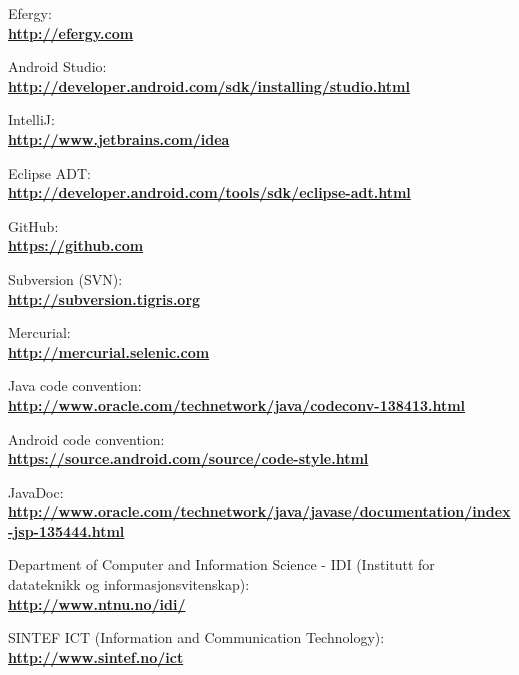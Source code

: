 \begin{thebibliography}{1}
 Efergy:\\
\textbf{ \url{http://efergy.com}}

 Android Studio:\\
\textbf{ \url{http://developer.android.com/sdk/installing/studio.html}}

 IntelliJ:\\
\textbf{ \url{http://www.jetbrains.com/idea}}

 Eclipse ADT:\\
\textbf{ \url{http://developer.android.com/tools/sdk/eclipse-adt.html}}

 GitHub:\\
\textbf{ \url{https://github.com}}

 Subversion (SVN):\\
\textbf{ \url{http://subversion.tigris.org}}

 Mercurial:\\
\textbf{ \url{http://mercurial.selenic.com}}

 Java code convention:\\
\textbf{ \url{http://www.oracle.com/technetwork/java/codeconv-138413.html}}

 Android code convention:\\
\textbf{ \url{https://source.android.com/source/code-style.html}}

 JavaDoc:\\
\textbf{ \url{http://www.oracle.com/technetwork/java/javase/documentation/index-jsp-135444.html}}

 Department of Computer and Information Science - IDI (Institutt for datateknikk og informasjonsvitenskap):\\
\textbf{ \url{http://www.ntnu.no/idi/}}

 SINTEF ICT (Information and Communication Technology): \\
\textbf{ \url{http://www.sintef.no/ict}}
\end{thebibliography}
